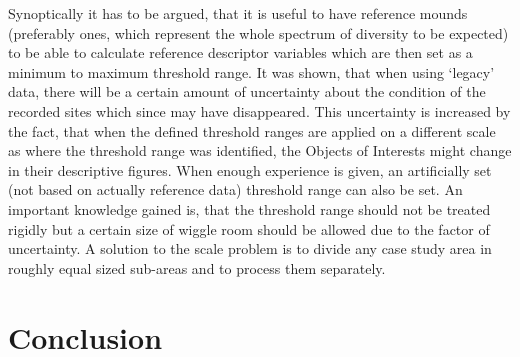 \documentclass[
  12pt,
]{article}
\begin{document}
Synoptically it has to be argued, that it is useful to have reference mounds (preferably ones, which represent the whole spectrum of diversity to be expected) to be able to calculate reference descriptor variables which are then set as a minimum to maximum threshold range. It was shown, that when using `legacy' data, there will be a certain amount of uncertainty about the condition of the recorded sites which since may have disappeared. This uncertainty is increased by the fact, that when the defined threshold ranges are applied on a different scale as where the threshold range was identified, the Objects of Interests might change in their descriptive figures. When enough experience is given, an artificially set (not based on actually reference data) threshold range can also be set. An important knowledge gained is, that the threshold range should not be treated rigidly but a certain size of wiggle room should be allowed due to the factor of uncertainty. A solution to the scale problem is to divide any case study area in roughly equal sized sub-areas and to process them separately.

\newpage

\vspace{5mm}
\justifying

\hypertarget{conclusion}{%
\section{Conclusion}\label{conclusion}}
\end{document}
